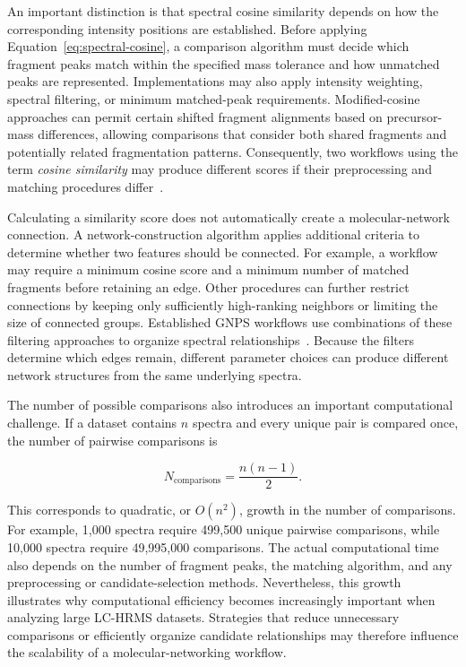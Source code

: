         An important distinction is that spectral cosine similarity depends on how the corresponding intensity positions are established. Before applying Equation~\ref{eq:spectral-cosine}, a comparison algorithm must decide which fragment peaks match within the specified mass tolerance and how unmatched peaks are represented. Implementations may also apply intensity weighting, spectral filtering, or minimum matched-peak requirements. Modified-cosine approaches can permit certain shifted fragment alignments based on precursor-mass differences, allowing comparisons that consider both shared fragments and potentially related fragmentation patterns. Consequently, two workflows using the term \emph{cosine similarity} may produce different scores if their preprocessing and matching procedures differ~\cite{Bittremieux2022,DallaValle2025}.

        Calculating a similarity score does not automatically create a molecular-network connection. A network-construction algorithm applies additional criteria to determine whether two features should be connected. For example, a workflow may require a minimum cosine score and a minimum number of matched fragments before retaining an edge. Other procedures can further restrict connections by keeping only sufficiently high-ranking neighbors or limiting the size of connected groups. Established GNPS workflows use combinations of these filtering approaches to organize spectral relationships~\cite{Wang2016,Nothias2020}. Because the filters determine which edges remain, different parameter choices can produce different network structures from the same underlying spectra.

        The number of possible comparisons also introduces an important computational challenge. If a dataset contains $n$ spectra and every unique pair is compared once, the number of pairwise comparisons is

        \begin{equation}
            N_{\mathrm{comparisons}} = \frac{n(n-1)}{2}.
            \label{eq:pairwise-comparisons}
        \end{equation}

        This corresponds to quadratic, or $O(n^2)$, growth in the number of comparisons. For example, 1,000 spectra require 499,500 unique pairwise comparisons, while 10,000 spectra require 49,995,000 comparisons. The actual computational time also depends on the number of fragment peaks, the matching algorithm, and any preprocessing or candidate-selection methods. Nevertheless, this growth illustrates why computational efficiency becomes increasingly important when analyzing large LC-HRMS datasets. Strategies that reduce unnecessary comparisons or efficiently organize candidate relationships may therefore influence the scalability of a molecular-networking workflow.

